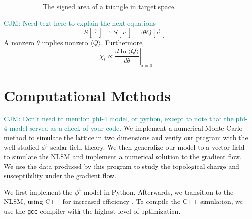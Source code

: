 \documentclass[a4paper,11pt]{article}
\newcommand{\e}{\vec e}
\newcommand\chris[1]{\textcolor{teal}{CJM: #1}}
\begin{document}
\begin{figure}
\begin{subfigure}[b]{0.4\textwidth}
    \caption{The signed area of a triangle in target space.}
    \end{subfigure}
    \caption{\label{fig:topology}}
\end{figure}

\chris{Need text here to explain the next equations}
\begin{equation*}
    S[\e\,] \rightarrow S[\e\,] - i \theta Q[\e\,].
\end{equation*}
A nonzero $\theta$ implies nonzero $\langle Q \rangle$. Furthermore,
\begin{equation}
    \chi_t \propto \left. \frac{d\,\mathrm{Im}\langle Q \rangle}{d\theta}\right|_{\theta=0}
\end{equation}

\section{Computational Methods}
\chris{Don't need to mention phi-4 model, or python, except to note that the phi-4 model served as a check of your code.}
We implement a numerical Monte Carlo method to simulate the lattice in two dimensions and verify our program with the well-studied $\phi^4$ scalar field theory. We then generalize our model to a vector field to simulate the NLSM and implement a numerical solution to the gradient flow. We use the data produced by this program to study the topological charge and susceptibility under the gradient flow.

We first implement the $\phi^4$ model in Python. Afterwards, we transition to the NLSM, using C++ for increased efficiency . To compile the C++ simulation, we use the \texttt{gcc} compiler with the highest level of optimization.
\end{document}
